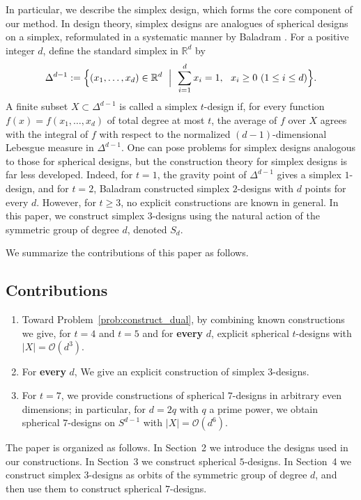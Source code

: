 \documentclass{amsart}
\theoremstyle{definition}
\theoremstyle{remark}
\numberwithin{equation}{section}
\newcommand{\R}{{\mathbb R}}
\newcommand{\order}{\mathcal{O}}
\begin{document}
In particular, we describe the simplex design, which forms the core component of our method.
In design theory, simplex designs are analogues of spherical designs on a simplex, reformulated in a systematic manner by Baladram \cite{Baladram2018}.
For a positive integer $d$, define the standard simplex in $\R^d$ by
\[
\Delta^{d-1}
:=\Bigl\{(x_1,\dots,x_d)\in\mathbb{R}^d\ \Bigm|\ \sum_{i=1}^d x_i=1,\ \ x_i\ge 0\ (1\le i\le d)\Bigr\}.
\]
A finite subset $X\subset\Delta^{d-1}$ is called a simplex $t$-design if, for every function $f(x)=f(x_1,\dots,x_d)$ of total degree at most $t$, the average of $f$ over $X$ agrees with the integral of $f$ with respect to the normalized $(d-1)$-dimensional Lebesgue measure in $\Delta^{d-1}$. One can pose problems for simplex designs analogous to those for spherical designs, but the construction theory for simplex designs is far less developed.
Indeed, for $t=1$, the gravity point of $\Delta^{d-1}$ gives a simplex $1$-design, and for $t=2$, Baladram \cite{Baladram2018} constructed simplex $2$-designs with $d$ points for every $d$.
However, for $t\ge 3$, no explicit constructions are known in general.
In this paper, we construct simplex $3$-designs using the natural action of the symmetric group of degree $d$, denoted $S_d$.

We summarize the contributions of this paper as follows.

\subsection*{Contributions}
\begin{enumerate}
  \item Toward Problem~\ref{prob:construct_dual}, by combining known constructions we give, for $t=4$ and $t=5$ and for \textbf{every} $d$, explicit spherical $t$-designs with $|X|=\order(d^3)$.
  \item For \textbf{every} $d$, We give an explicit construction of simplex $3$-designs.
  \item For $t=7$, we provide constructions of spherical $7$-designs in arbitrary even dimensions; in particular, for $d=2q$ with $q$ a prime power, we obtain spherical $7$-designs on $S^{d-1}$ with $|X|=\order(d^6)$.

\end{enumerate}

The paper is organized as follows.
In Section~2 we introduce the designs used in our constructions.
In Section~3 we construct spherical $5$-designs.
In Section~4 we construct simplex $3$-designs as orbits of the symmetric group of degree $d$, and then use them to construct spherical $7$-designs.
\end{document}
